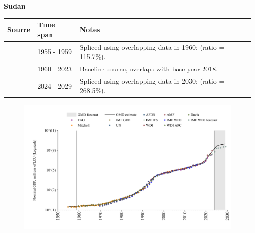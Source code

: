 \documentclass[12pt,a4paper,landscape]{article}
\begin{document}
\begin{adjustbox}{max totalsize={\paperwidth}{\paperheight},center}
\begin{minipage}[t][\textheight][t]{\textwidth}
\vspace*{0.5cm}
{}
\begin{center}
{\Large\bfseries Sudan}
\end{center}
\vspace{0.5cm}
\begin{table}[H]
\centering
\small
\begin{tabular}{|l|l|l|}
\hline
\textbf{Source} & \textbf{Time span} & \textbf{Notes} \\
\hline
\rowcolor{white}\cite{Mitchell}& 1955 - 1959 &Spliced using overlapping data in 1960: (ratio = 115.7\%).\\
\rowcolor{lightgray}\cite{WDI}& 1960 - 2023 &Baseline source, overlaps with base year 2018.\\
\rowcolor{white}\cite{IMF_WEO_forecast}& 2024 - 2029 &Spliced using overlapping data in 2030: (ratio = 268.5\%).\\
\hline
\end{tabular}
\end{table}
\begin{figure}[H]
\centering
\includegraphics[width=\textwidth,height=0.6\textheight,keepaspectratio]{graphs/SDN_nGDP.pdf}
\end{figure}
\end{minipage}
\end{adjustbox}
\end{document}
